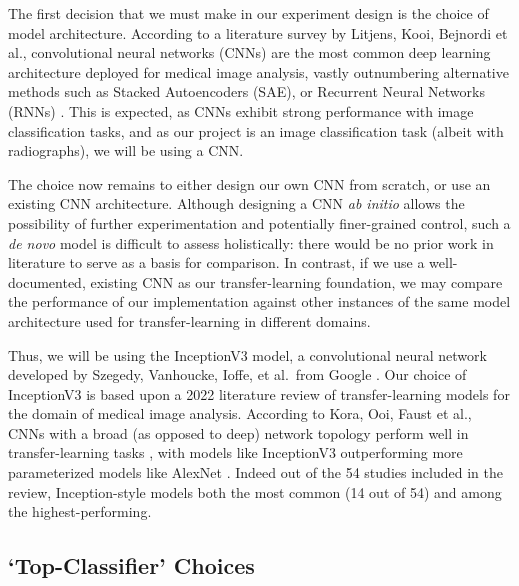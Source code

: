 The first decision that we must make in our experiment design is the choice of model architecture.
According to a literature survey by Litjens, Kooi, Bejnordi et al., convolutional neural networks (CNNs) are the most common deep learning architecture deployed for medical image analysis, vastly outnumbering alternative methods such as Stacked Autoencoders (SAE), or Recurrent Neural Networks (RNNs) \autocite[77]{cnn-most-common}.
This is expected, as CNNs exhibit strong performance with image classification tasks, and as our project is an image classification task (albeit with radiographs), we will be using a CNN.

The choice now remains to either design our own CNN from scratch, or use an existing CNN architecture.
Although designing a CNN \emph{ab initio} allows the possibility of further experimentation and potentially finer-grained control, such a \emph{de novo} model is difficult to assess holistically: there would be no prior work in literature to serve as a basis for comparison.
In contrast, if we use a well-documented, existing CNN as our transfer-learning foundation, we may compare the performance of our implementation against other instances of the same model architecture used for transfer-learning in different domains.

Thus, we will be using the InceptionV3 model, a convolutional neural network developed by Szegedy, Vanhoucke, Ioffe, et al.\ from Google \autocite{inceptionv3}. Our choice of InceptionV3 is based upon a 2022 literature review of transfer-learning models for the domain of medical image analysis. According to Kora, Ooi, Faust et al., CNNs with a broad (as opposed to deep) network topology perform well in transfer-learning tasks \autocite{kora2022}, with models like InceptionV3 outperforming more parameterized models like AlexNet \autocite{alexnet}. Indeed out of the 54 studies included in the review, Inception-style models both the most common (14 out of 54) and among the highest-performing. \autocite{kora2022}

\subsection{\enquote*{Top-Classifier} Choices}\label{sec:classifier}

